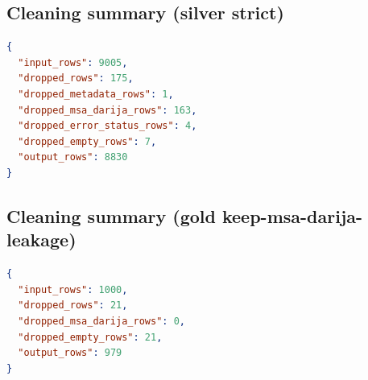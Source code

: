 \documentclass[11pt,a4paper]{article}
\begin{document}
\subsection{Cleaning summary (silver strict)}
\begin{lstlisting}[language=json]
{
  "input_rows": 9005,
  "dropped_rows": 175,
  "dropped_metadata_rows": 1,
  "dropped_msa_darija_rows": 163,
  "dropped_error_status_rows": 4,
  "dropped_empty_rows": 7,
  "output_rows": 8830
}
\end{lstlisting}

\subsection{Cleaning summary (gold keep-msa-darija-leakage)}
\begin{lstlisting}[language=json]
{
  "input_rows": 1000,
  "dropped_rows": 21,
  "dropped_msa_darija_rows": 0,
  "dropped_empty_rows": 21,
  "output_rows": 979
}
\end{lstlisting}
\end{document}
